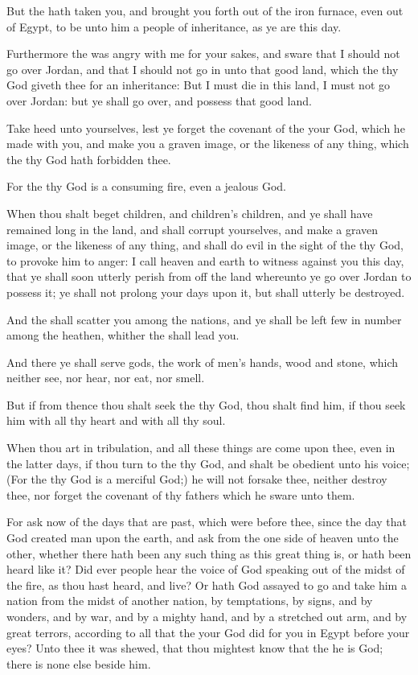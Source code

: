 \verse But the \LORD hath taken you, and brought you forth out of the iron furnace, even out of Egypt, to be unto him a people of inheritance, as ye are this day.

\verse Furthermore the \LORD was angry with me for your sakes, and sware that I should not go over Jordan, and that I should not go in unto that good land, which the \LORD thy God giveth thee for an inheritance: \verse But I must die in this land, I must not go over Jordan: but ye shall go over, and possess that good land.

\verse Take heed unto yourselves, lest ye forget the covenant of the \LORD your God, which he made with you, and make you a graven image, or the likeness of any thing, which the \LORD thy God hath forbidden thee.

\verse For the \LORD thy God is a consuming fire, even a jealous God.

\verse When thou shalt beget children, and children's children, and ye shall have remained long in the land, and shall corrupt yourselves, and make a graven image, or the likeness of any thing, and shall do evil in the sight of the \LORD thy God, to provoke him to anger: \verse I call heaven and earth to witness against you this day, that ye shall soon utterly perish from off the land whereunto ye go over Jordan to possess it; ye shall not prolong your days upon it, but shall utterly be destroyed.

\verse And the \LORD shall scatter you among the nations, and ye shall be left few in number among the heathen, whither the \LORD shall lead you.

\verse And there ye shall serve gods, the work of men's hands, wood and stone, which neither see, nor hear, nor eat, nor smell.

\verse But if from thence thou shalt seek the \LORD thy God, thou shalt find him, if thou seek him with all thy heart and with all thy soul.

\verse When thou art in tribulation, and all these things are come upon thee, even in the latter days, if thou turn to the \LORD thy God, and shalt be obedient unto his voice; \verse (For the \LORD thy God is a merciful God;) he will not forsake thee, neither destroy thee, nor forget the covenant of thy fathers which he sware unto them.

\verse For ask now of the days that are past, which were before thee, since the day that God created man upon the earth, and ask from the one side of heaven unto the other, whether there hath been any such thing as this great thing is, or hath been heard like it?  \verse Did ever people hear the voice of God speaking out of the midst of the fire, as thou hast heard, and live?  \verse Or hath God assayed to go and take him a nation from the midst of another nation, by temptations, by signs, and by wonders, and by war, and by a mighty hand, and by a stretched out arm, and by great terrors, according to all that the \LORD your God did for you in Egypt before your eyes?  \verse Unto thee it was shewed, that thou mightest know that the \LORD he is God; there is none else beside him.

